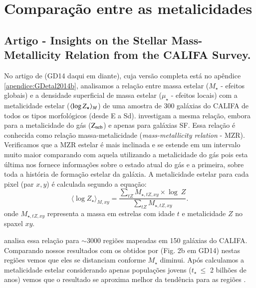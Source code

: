 
\section{Comparação entre as metalicidades}
\label{sec:synvsneb:Z}

\subsection{Artigo - Insights on the Stellar Mass-Metallicity Relation from the CALIFA Survey.}

No artigo de \citet{GonzalezDelgado.etal.2014b} (GD14 daqui em diante), cuja versão completa está no
apêndice \ref{apendice:GDetal2014b}, analisamos a relação entre massa estelar ($M_\star$ - efeitos
globais) e a densidade superficial de massa estelar ($\mu_\star$ - efeitos locais) com a
metalicidade estelar ($\meanM{\log Z_\star}$) de uma amostra de 300 galáxias do CALIFA de todos os
tipos morfológicos (desde E a Sd). \citet{Tremonti.etal.2004a} investigam a mesma relação, embora
para a metalicidade do gás ($\mathrm{Z}_{\mathrm{neb}}$) e apenas para galáxias SF. Essa relação é conhecida como relação
massa-metalicidade ({\em mass-metallicity relation} - MZR). Verificamos que a MZR estelar é mais
inclinada e se estende em um intervalo muito maior comparando com aquela utilizando a metalicidade
do gás pois esta última nos fornece informações sobre o estado atual do gás e a primeira, sobre toda
a história de formação estelar da galáxia. A metalicidade estelar para cada pixel (par $x,y$) é
calculada segundo a equação:
\begin{equation}
 	\label{eq:logZmass}
 	\langle \log Z_\star \rangle_{M,xy} = 
	\frac{ \sum_{tZ} M_{\star,tZ,xy} \times \log\ Z}{
	\sum_{tZ} M_{\star,tZ,xy} }.
\end{equation}
\noindent onde $M_{\star,tZ,xy}$ representa a massa em estrelas com idade $t$ e metalicidade $Z$ no
spaxel $xy$.

\citet{Sanchez.etal.2013a} analisa essa relação para $\sim 3000$ regiões \Hii mapeadas em 150
galáxias do CALIFA. Comparando nossos resultados com os obtidos por \citeauthor{Sanchez.etal.2013a}
(Fig. 2b em GD14) nestas regiões vemos que eles se distanciam conforme $M_\star$ diminui.
Após calculamos a metalicidade estelar considerando apenas populações jovens ($t_\star\ \leq$ 2
bilhões de anos) vemos que o resultado se aproxima melhor da tendência para as regiões \Hii.

